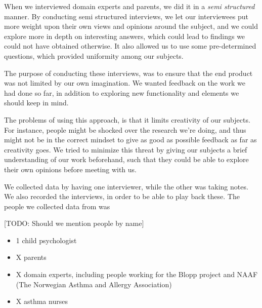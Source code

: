 When we interviewed domain experts and parents, we did it in a \emph{semi structured} manner. By conducting semi structured interviews, we let our interviewees put more weight upon their own views and opinions around the subject, and we could explore more in depth on interesting answers, which could lead to findings we could not have obtained otherwise. It also allowed us to use some pre-determined questions, which provided uniformity among our subjects.

The purpose of conducting these interviews, was to ensure that the end product was not limited by our own imagination. We wanted feedback on the work we had done so far, in addition to exploring new functionality and elements we should keep in mind. 

The problems of using this approach, is that it limits creativity of our subjects. For instance, people might be shocked over the research we're doing, and thus might not be in the correct mindset to give as good as possible feedback as far as creativity goes. We tried to minimize this threat by giving our subjects a brief understanding of our work beforehand, such that they could be able to explore their own opinions before meeting with us.

We collected data by having one interviewer, while the other was taking notes. We also recorded the interviews, in order to be able to play back these. The people we collected data from was

[TODO: Should we mention people by name]
\begin{itemize}
  \item 1 child psychologist
  \item X parents
  \item X domain experts, including people working for the Blopp project and NAAF (The Norwegian Asthma and Allergy Association) 
  \item X asthma nurses
\end{itemize} 

  